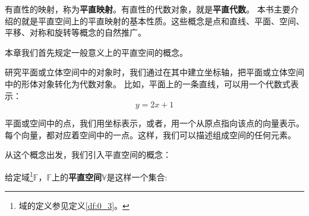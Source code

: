 \documentclass[12pt,UTF8,fontset=none]{ctexbook}
\begin{document}
有直性的映射，称为\textbf{平直映射}。有直性的代数对象，就是\textbf{平直代数}。
本书主要介绍的就是平直空间上的平直映射的基本性质。这些概念是点和直线、平面、空间、平移、对称和旋转等概念的自然推广。

本章我们首先规定一般意义上的平直空间的概念。

研究平面或立体空间中的对象时，我们通过在其中建立坐标轴，把平面或立体空间中的形体对象转化为代数对象。
比如，平面上的一条直线，可以用一个代数式表示：
$$ y = 2x + 1$$

平面或空间中的点，我们用坐标表示，或者，用一个从原点指向该点的向量表示。
每个向量，都对应着空间中的一点。这样，我们可以描述组成空间的任何元素。

从这个概念出发，我们引入平直空间的概念：

\begin{df}\label{df:1_1}
给定域\footnote{域的定义参见定义\ref{df:0_3}。}$\mathbb{F}$，$\mathbb{F}$上的\textbf{平直空间}$\mathbb{V}$是这样一个集合:


\end{df}
\end{document}
